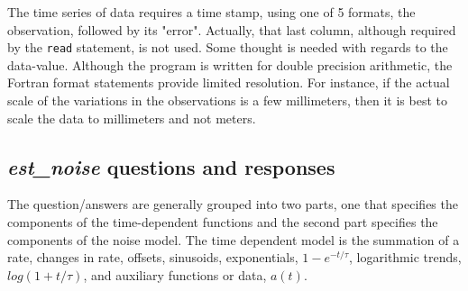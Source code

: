 \documentclass[12pt]{amsart}
\begin{document}
The time series of data requires a time stamp, using one of 5 formats, the observation, followed by its "error". Actually,
that last column, although required by the \texttt{read} statement, is not used. Some thought is needed with
regards to the data-value.  Although the program is written for double precision arithmetic, the Fortran format statements
provide limited resolution. For instance, if the actual scale of the variations in the observations is a few
millimeters, then it is best to scale the data to millimeters and not meters. 


\subsection{\textit{est\_noise} questions and responses}

The question/answers are generally grouped into two parts, one that specifies the components of the time-dependent functions and the second part specifies the components of the noise model.  The time dependent model is the summation of a rate, changes in rate, offsets, sinusoids, exponentials, $1 - e^{-t/{\tau}}$, logarithmic trends,
$log(1 + {t/{\tau}})$, and auxiliary functions or data, $a(t)$.
\end{document}
